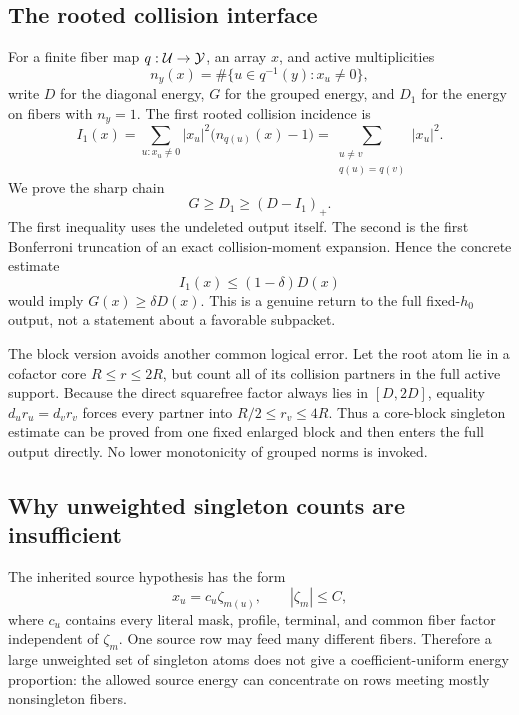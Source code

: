 \subsection{The rooted collision interface}

For a finite fiber map \(q:\mathcal U\to\mathcal Y\), an array \(x\), and active
multiplicities
\begin{equation}
 n_y(x)=\#\{u\in q^{-1}(y):x_u\ne0\},
 \label{eq:tpc57-intro-active-multiplicity}
\end{equation}
write \(D\) for the diagonal energy, \(G\) for the grouped energy, and
\(D_1\) for the energy on fibers with \(n_y=1\).  The first rooted
collision incidence is
\begin{equation}
 I_1(x)
 =\sum_{u:x_u\ne0}|x_u|^2\bigl(n_{q(u)}(x)-1\bigr)
 =\sum_{\substack{u\ne v\\q(u)=q(v)}}|x_u|^2.
 \label{eq:tpc57-intro-rooted-incidence}
\end{equation}
We prove the sharp chain
\begin{equation}
 \boxed{G\ge D_1\ge(D-I_1)_+.}
 \label{eq:tpc57-intro-singleton-floor}
\end{equation}
The first inequality uses the undeleted output itself.  The second is the
first Bonferroni truncation of an exact collision-moment expansion.  Hence
the concrete estimate
\begin{equation}
 I_1(x)\le(1-\delta)D(x)
 \label{eq:tpc57-intro-needed-incidence}
\end{equation}
would imply \(G(x)\ge\delta D(x)\).  This is a genuine return to the full
fixed-\(h_0\) output, not a statement about a favorable subpacket.

The block version avoids another common logical error.  Let the root atom
lie in a cofactor core \(R\le r\le2R\), but count all of its collision
partners in the full active support.  Because the direct squarefree factor
always lies in \([D,2D]\), equality \(d_ur_u=d_vr_v\) forces every partner
into \(R/2\le r_v\le4R\).  Thus a core-block singleton estimate can be
proved from one fixed enlarged block and then enters the full output
directly.  No lower monotonicity of grouped norms is invoked.

\subsection{Why unweighted singleton counts are insufficient}

The inherited source hypothesis has the form
\begin{equation}
 x_u=c_u\zeta_{m(u)},
 \qquad |\zeta_m|\le C,
 \label{eq:tpc57-intro-row-factorization}
\end{equation}
where \(c_u\) contains every literal mask, profile, terminal, and common
fiber factor independent of \(\zeta_m\).  One source row may feed many
different fibers.  Therefore a large unweighted set of singleton atoms
does not give a coefficient-uniform energy proportion: the allowed source
energy can concentrate on rows meeting mostly nonsingleton fibers.

